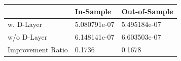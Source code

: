 \begin{tabular}{lll}
\toprule
 & In-Sample & Out-of-Sample \\
\midrule
w. D-Layer & 5.080791e-07 & 5.495184e-07 \\
w/o D-Layer & 6.148141e-07 & 6.603503e-07 \\
Improvement Ratio & 0.1736 & 0.1678 \\
\bottomrule
\end{tabular}
